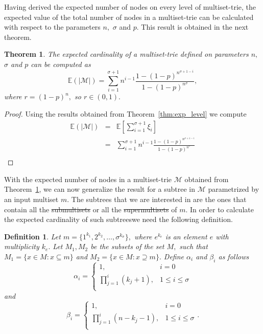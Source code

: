 \documentclass[10pt,letterpaper]{article}
\newtheorem{theorem}{Theorem}
\newtheorem{definition}{Definition}
\providecommand{\DIFaddtex}[1]{{\protect\color{blue}\uwave{#1}}} %
\providecommand{\DIFdeltex}[1]{{\protect\color{red}\sout{#1}}}                      %
\providecommand{\DIFaddbegin}{} %
\providecommand{\DIFaddend}{} %
\providecommand{\DIFdelbegin}{} %
\providecommand{\DIFdelend}{} %
\providecommand{\DIFadd}[1]{\texorpdfstring{\DIFaddtex{#1}}{#1}} %
\providecommand{\DIFdel}[1]{\texorpdfstring{\DIFdeltex{#1}}{}} %
\newcommand{\DIFscaledelfig}{0.5}
\newlength{\DIFdelgraphicswidth} %
\newlength{\DIFdelgraphicsheight} %
\newcommand{\DIFaddincludegraphics}[2][]{{\color{blue}\fbox{\DIFOincludegraphics[#1]{#2}}}} %
\newcommand{\DIFdelincludegraphics}[2][]{%
\sbox{\DIFdelgraphicsbox}{\DIFOincludegraphics[#1]{#2}}%
\settoboxwidth{\DIFdelgraphicswidth}{\DIFdelgraphicsbox} %
\settoboxtotalheight{\DIFdelgraphicsheight}{\DIFdelgraphicsbox} %
\scalebox{\DIFscaledelfig}{%
\parbox[b]{\DIFdelgraphicswidth}{\usebox{\DIFdelgraphicsbox}\\[-\baselineskip] \rule{\DIFdelgraphicswidth}{0em}}\llap{\resizebox{\DIFdelgraphicswidth}{\DIFdelgraphicsheight}{%
\setlength{\unitlength}{\DIFdelgraphicswidth}%
\begin{picture}(1,1)%
\thicklines\linethickness{2pt} %
{\color[rgb]{1,0,0}\put(0,0){\framebox(1,1){}}}%
{\color[rgb]{1,0,0}\put(0,0){\line( 1,1){1}}}%
{\color[rgb]{1,0,0}\put(0,1){\line(1,-1){1}}}%
\end{picture}%
}\hspace*{3pt}}} %
} %
\DeclareRobustCommand{\DIFaddbegin}{\DIFOaddbegin \let\includegraphics\DIFaddincludegraphics} %
\DeclareRobustCommand{\DIFaddend}{\DIFOaddend \let\includegraphics\DIFOincludegraphics} %
\DeclareRobustCommand{\DIFdelbegin}{\DIFOdelbegin \let\includegraphics\DIFdelincludegraphics} %
\DeclareRobustCommand{\DIFdelend}{\DIFOaddend \let\includegraphics\DIFOincludegraphics} %
\begin{document}
Having derived the expected number of nodes on every level of multiset-trie, the
expected value of the total number of nodes in a multiset-trie can be calculated 
with respect to the parameters $n,$ $\sigma$ and $p.$ This result is obtained in 
the next theorem.

\begin{theorem}\label{thm:exp_nodes}
The expected cardinality of a multiset-trie defined on parameters $n,$ $\sigma$ 
and $p$ can be computed as 
\begin{equation}
\mathbb{E}( | \mathcal{M} | ) = \sum_{i=1}^{\sigma+1} n^{i-1} \frac{1-(1-p)^{n^{\sigma +1 -i}}}{1-(1-p)^{n^{\sigma}}},
\end{equation}
where $r = (1-p)^n,$ so $r\in(0,1).$
\end{theorem}
\begin{proof}
Using the results obtained from Theorem~\ref{thm:exp_level} we compute 
\begin{eqnarray*}
\mathbb{E}( | \mathcal{M} | ) &=& \mathbb{E}\left[ \sum_{i=1}^{\sigma+1} \xi_i \right] \\
&=& \sum_{i=1}^{\sigma + 1} n^{i-1} \frac{1-(1-p)^{n^{\sigma + 1 -i}}}{1-(1-p)^{n^{\sigma}}} \\
\end{eqnarray*}

\end{proof}

With the expected number of nodes in a multiset-trie $\mathcal{M}$ obtained from 
Theorem~\ref{thm:exp_nodes}, we can now generalize the result for a subtree 
in $\mathcal{M}$ parametrized by an input multiset $m.$ The subtrees that we 
are interested in are the ones that contain all the \DIFdelbegin \DIFdel{submultisets }\DIFdelend \DIFaddbegin \DIFadd{sub-multisets }\DIFaddend or all the 
\DIFdelbegin \DIFdel{supermultisets }\DIFdelend \DIFaddbegin \DIFadd{super-multisets }\DIFaddend of $m.$ In order to calculate the expected cardinality of such 
subtrees\DIFaddbegin \DIFadd{, }\DIFaddend we need the following definition. 

\begin{definition}\label{def:params}
Let $m = \{ 1^{k_1}, 2^{k_2}, \ldots, \sigma^{k_\sigma} \},$ where 
$e^{k_e}$ is an element $e$ with multiplicity $k_e.$ Let $M_1, M_2$ be 
the subsets of the set $M,$ such that $M_1 = \{ x\in M : x\subseteq m \}$ and 
$M_2 = \{ x\in M : x\supseteq m \}.$
Define $\alpha_i$ and $\beta_i$ as follows 
\begin{equation*}
\alpha_i = \begin{cases}
1, & i=0 \\
\prod_{j=1}^i (k_j+1), & 1\leq i\leq\sigma \\
\end{cases}
\end{equation*} 
and 
\begin{equation*}
\beta_i = \begin{cases}
1, & i=0 \\
\prod_{j=1}^i (n-k_j-1), & 1\leq i\leq\sigma \\
\end{cases}.
\end{equation*}
\end{definition}
\end{document}
